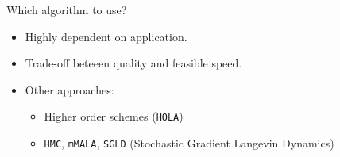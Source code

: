 \documentclass[aspectratio=169]{beamer}
\begin{document}
\begin{frame}{Which algorithm to use?}
    \begin{itemize}
        \item Highly dependent on application.
        \item Trade-off beteeen quality and feasible speed.
        \item Other approaches:
        \begin{itemize}
            \item Higher order schemes (\texttt{HOLA})
            \item \texttt{HMC}, \texttt{mMALA}, \texttt{SGLD} (Stochastic Gradient Langevin Dynamics)
        \end{itemize}
    \end{itemize}

    \end{frame}

\end{document}
